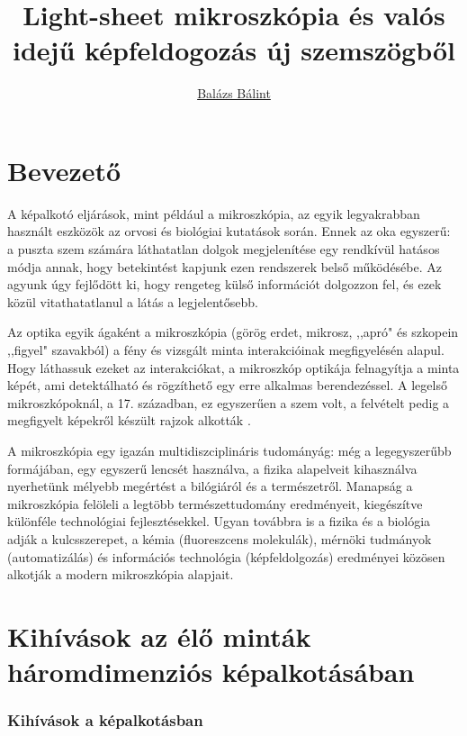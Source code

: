 \documentclass{booklet_style}
\author{\href{mailto:balint.balazs@embl.de}{Balázs Bálint}}
\title{Light-sheet mikroszkópia és valós idejű képfeldogozás új szemszögből}
\begin{document}
\graphicspath{{./figures/}}
\maketitle

\clearpage{\thispagestyle{empty}\cleardoublepage}


\setcounter{page}{1}
\section{Bevezető}

A képalkotó eljárások, mint például a mikroszkópia, az egyik legyakrabban használt eszközök az orvosi és biológiai kutatások során. Ennek az oka egyszerű: a puszta szem számára láthatatlan dolgok megjelenítése egy rendkívül hatásos módja annak, hogy betekintést kapjunk ezen rendszerek belső működésébe. Az agyunk úgy fejlődött ki, hogy rengeteg külső információt dolgozzon fel, és ezek közül vitathatatlanul a látás a legjelentősebb.

Az optika egyik ágaként a mikroszkópia (görög erdet, mikrosz, ,,apró" és szkopein ,,figyel" szavakból) a fény és vizsgált minta interakcióinak megfigyelésén alapul. Hogy láthassuk ezeket az interakciókat, a mikroszkóp optikája felnagyítja a minta képét, ami detektálható és rögzíthető egy erre alkalmas berendezéssel. A legelső mikroszkópoknál, a 17. században, ez egyszerűen a szem volt, a felvételt pedig a megfigyelt képekről készült rajzok alkották \cite{hooke_micrographia:_1665}.

A mikroszkópia egy igazán multidiszciplináris tudományág: még a legegyszerűbb formájában, egy egyszerű lencsét használva, a fizika alapelveit kihasználva nyerhetünk mélyebb megértést a bilógiáról és a természetről. Manapság a mikroszkópia felöleli a legtöbb természettudomány eredményeit, kiegészítve különféle technológiai fejlesztésekkel. Ugyan továbbra is a fizika és a biológia adják a kulcsszerepet, a kémia (fluoreszcens molekulák), mérnöki tudmányok (automatizálás) és információs technológia (képfeldolgozás) eredményei közösen alkotják a modern mikroszkópia alapjait.

\section{Kihívások az élő minták háromdimenziós képalkotásában}


\subsubsection{Kihívások a képalkotásban}
\end{document}
